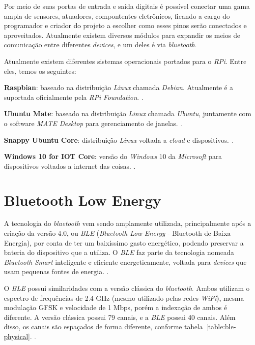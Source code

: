 \documentclass[
	12pt,				%
	openright,			%
	oneside,			%
	a4paper,			%
	chapter=TITLE,		%
	english,			%
	brazil				%
	]{abntex2}
\begin{document}
{Por meio de suas portas de entrada e saída digitais é possível conectar uma gama ampla de sensores, atuadores, compontentes eletrônicos, ficando a cargo do programador e criador do projeto a escolher como esses pinos serão conectados e aproveitados. Atualmente existem diversos módulos para expandir os meios de comunicação entre diferentes \textit{devices}, e um deles é via \textit{bluetooth}.

Atualmente existem diferentes sistemas operacionais portados para o \textit{RPi}. Entre eles, temos os seguintes:

\begin{alineas}
	\item \textbf{Raspbian}: baseado na distribuição \textit{Linux} chamada \textit{Debian}. Atualmente é a suportada oficialmente pela \textit{RPi Foundation}. \cite{rpi-download}.
	\item \textbf{Ubuntu Mate}: baseado na distribuição \textit{Linux} chamada \textit{Ubuntu}, juntamente com o software \textit{MATE Desktop} para gerenciamento de janelas. \cite{ubuntu-mate}.
	\item \textbf{Snappy Ubuntu Core}: distribuição \textit{Linux} voltada a \textit{cloud} e dispositivos. \cite{snappy-ubuntu}.
	\item \textbf{Windows 10 for IOT Core}: versão do \textit{Windows} 10 da \textit{Microsoft} para dispositivos voltados a internet das coisas. \cite{windows10-iot}.
\end{alineas}

\section{Bluetooth Low Energy}

A tecnologia do \textit{bluetooth} vem sendo amplamente utilizada, principalmente após a criação da versão 4.0, ou \textit{BLE} (\textit{Bluetooth Low Energy} - Bluetooth de Baixa Energia), por conta de ter um baixíssimo gasto energético, podendo preservar a bateria do dispositivo que a utiliza. O \textit{BLE} faz parte da tecnologia nomeada \textit{Bluetooth Smart} inteligente e eficiente energeticamente, voltada para \textit{devices} que usam pequenas fontes de energia. \cite{bluetooth-smart}.

O \textit{BLE} possui similaridades com a versão clássica do \textit{bluetooth}. Ambos utilizam o espectro de frequências de 2.4 GHz (mesmo utilizado pelas redes \textit{WiFi}), mesma modulação GFSK e velocidade de 1 Mbps, porém a indexação de ambos é diferente. A versão clássica possui 79 canais, e a \textit{BLE} possui 40 canais. Além disso, os canais são espaçados de forma diferente, conforme tabela~\ref{table:ble-physical}. \cite{ble-packets}.

}
\end{document}
